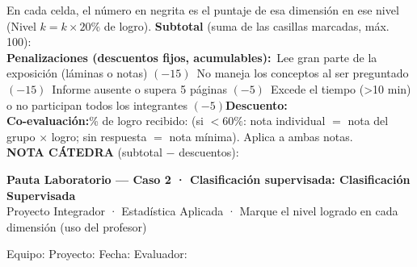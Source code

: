 \documentclass[11pt,letterpaper]{article}
\newcommand{\chk}{\framebox[0.42cm]{\rule{0pt}{0.30cm}}}
\begin{document}
\vspace{0.2cm}
{\small
En cada celda, el número en negrita es el puntaje de esa dimensión en ese nivel (Nivel $k = k\times 20\%$ de logro). \textbf{Subtotal} (suma de las casillas marcadas, máx. 100): \underline{\hspace{2cm}}\\[0.2cm]
\textbf{Penalizaciones (descuentos fijos, acumulables):}\quad \chk\ Lee gran parte de la exposición (láminas o notas) $(-15)$\quad \chk\ No maneja los conceptos al ser preguntado $(-15)$\quad \chk\ Informe ausente o supera 5 páginas $(-5)$\quad \chk\ Excede el tiempo (>10 min) o no participan todos los integrantes $(-5)$\quad \textbf{Descuento:} \underline{\hspace{1.6cm}}\\[0.2cm]
\textbf{Co-evaluación:}\quad \% de logro recibido: \underline{\hspace{1.8cm}}\quad (si $<60\%$: nota individual $=$ nota del grupo $\times$ logro; sin respuesta $=$ nota mínima). Aplica a ambas notas.\\[0.2cm]
\textbf{NOTA CÁTEDRA} (subtotal $-$ descuentos): \underline{\hspace{2.2cm}}
}

\clearpage
\begin{center}
{\large \textbf{Pauta Laboratorio --- Caso 2 · Clasificación supervisada: Clasificación Supervisada}}\\[0.1cm]
{\footnotesize Proyecto Integrador · Estadística Aplicada · Marque el nivel logrado en cada dimensión (uso del profesor)}
\end{center}
\vspace{0.05cm}
{\small Equipo: \underline{\hspace{5cm}}\quad Proyecto: \underline{\hspace{5.5cm}}\quad Fecha: \underline{\hspace{2.6cm}}\quad Evaluador: \underline{\hspace{3.5cm}}}
\vspace{0.15cm}
\end{document}
